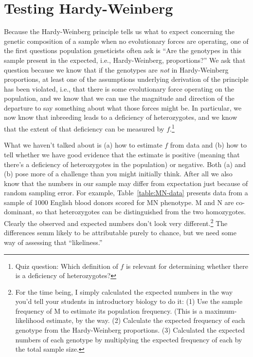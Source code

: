\chapter{Testing Hardy-Weinberg}

Because the Hardy-Weinberg principle tells us what to expect
concerning the genetic composition of a sample when no evolutionary
forces are operating, one of the first questions population
geneticists often ask is ``Are the genotypes in this sample present in
the expected, i.e., Hardy-Weinberg, proportions?'' We ask that
question because we know that if the genotypes are {\it not\/} in
Hardy-Weinberg proportions, at least one of the assumptions underlying
derivation of the principle has been violated, i.e., that there is
some evolutionary force operating on the population, and we know that
we can use the magnitude and direction of the departure to say
something about what those forces might be. In particular, we now know
that inbreeding leads to a deficiency of heterozygotes, and we know
that the extent of that deficiency can be measured by
$f$.\footnote{Quiz question: Which definition of $f$ is relevant for
  determining whether there is a deficiency of heterozygotes?}

What we haven't talked about is (a) how to estimate $f$ from data and
(b) how to tell whether we have good evidence that the estimate is
positive (meaning that there's a deficiency of heterozygotes in the
population) or negative. Both (a) and (b) pose more of a challenge
than you might initially think. After all we also know that the
numbers in our sample may differ from expectation just because of
random sampling error. For example, Table~\ref{table:MN-data} presents
data from a sample of 1000 English blood donors scored for MN
phenotype. M and N are co-dominant, so that heterozygotes can be
distinguished from the two homozygotes. Clearly the observed and
expected numbers don't look very different.\footnote{For the time
  being, I simply calculated the expected numbers in the way you'd
  tell your students in introductory biology to do it: (1) Use the
  sample frequency of M to estimate its population frequency. (This is
  a maximum-likelihood estimate, by the way. (2) Calculate the
  expected frequency of each genotype from the Hardy-Weinberg
  proportions. (3) Calculated the expected numbers of each genotype by
  multiplying the expected frequency of each by the total sample
  size.} The differences semm likely to be attributable purely to
chance, but we need some way of assessing that
``likeliness.''

